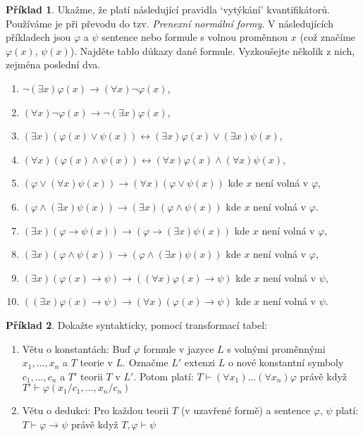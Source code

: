 \documentclass[a4paper]{article}
\theoremstyle{plain}
\theoremstyle{definition}
\newtheorem{problem}{Příklad}
\begin{document}
\medskip\begin{problem} %
    Ukažme, že platí následující pravidla `vytýkání' kvantifikátorů. Používáme je při převodu do tzv. \emph{Prenexní normální formy}. V následujících příkladech jsou $\varphi$ a $\psi$ sentence nebo formule s volnou proměnnou $x$ (což značíme $\varphi(x)$, $\psi(x)$). Najděte tablo důkazy dané formule. Vyzkoušejte několik z nich, zejména poslední dva.
\begin{enumerate}[noitemsep]
    \item $\neg(\exists x)\varphi(x)\to (\forall x)\neg \varphi(x)$,
    \item $(\forall x)\neg \varphi(x)\to \neg(\exists x)\varphi(x)$,
    \item $(\exists x)(\varphi(x)\vee \psi(x))\leftrightarrow (\exists x)\varphi(x)\vee (\exists x)\psi(x)$,
    \item $(\forall x)(\varphi(x)\wedge\psi(x))\leftrightarrow (\forall x)\varphi(x)\wedge(\forall x)\psi(x)$,
    \item $(\varphi \vee (\forall x)\psi(x))\to (\forall x)(\varphi \vee \psi(x))$ kde $x$ není volná v $\varphi$,
    \item $(\varphi \wedge (\exists x)\psi(x))\to (\exists x)(\varphi \wedge \psi(x))$ kde $x$ není volná v $\varphi$.
    \item $(\exists x)(\varphi \to \psi(x))\to(\varphi \to (\exists x)\psi(x))$ kde $x$ není volná v $\varphi$,
    \item $(\exists x)(\varphi \wedge \psi(x))\to(\varphi \wedge (\exists x)\psi(x))$ kde $x$ není volná v $\varphi$,
    \item $(\exists x)(\varphi(x)\to\psi)\to((\forall x)\varphi(x)\to \psi)$ kde $x$ není volná v $\psi$,
    \item $((\exists x)\varphi(x)\to\psi)\to(\forall x)(\varphi(x)\to \psi)$ kde $x$ není volná v $\psi$.
\end{enumerate}
\end{problem}


\medskip\begin{problem} Dokažte syntakticky, pomocí transformací tabel:
\begin{enumerate}
    \item Větu o konstantách: Buď $\varphi$ formule v jazyce $L$ s volnými proměnnými $x_1,\dots,x_n$ a $T$ teorie v $L$. Označme $L'$ extenzi $L$ o nové konstantní symboly $c_1,\dots,c_n$ a $T'$ teorii $T$ v $L'$. Potom platí:
    $T \vdash (\forall x_1)\dots(\forall x_n)\varphi$ právě když $T'\vdash\varphi(x_1/c_1,\dots,x_n/c_n)$
    \item Větu o dedukci: Pro každou teorii $T$ (v uzavřené formě) a sentence $\varphi$, $\psi$ platí: $T\vdash \varphi\to\psi$ právě když $T,\varphi\vdash\psi$
\end{enumerate}
\end{problem} 
  
\end{document}
